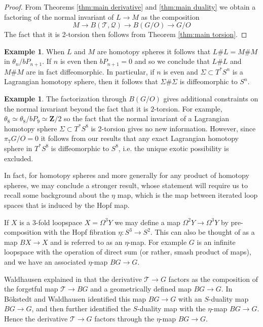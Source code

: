 \documentclass[reqno]{amsart}
\theoremstyle{theorem}
\theoremstyle{remark}
\theoremstyle{definition}
\newtheorem{example}[corollary]{Example}
\newcommand{\T}{\mathcal{T}}
\newcommand{\bZ}{\mathbf{Z}}
\newcommand{\QQ}{\mathcal{Q}}
\begin{document}
\begin{proof} From Theorems \ref{thm:main derivative} and \ref{thm:main duality} we obtain a factoring of the normal invariant of $L \to M$ as the composition 
$$ M \to B(\T,\QQ) \to B(G/O) \to G/O $$ 
The fact that it is 2-torsion then follows from Theorem \ref{thm:main torsion}.
\end{proof}


\begin{example} When $L$ and $M$ are homotopy spheres it follows that $L \# L =  M \# M$ in $\theta_n/bP_{n+1}$. If $n$ is even then $bP_{n+1}=0$ and so we conclude that $L \# L$ and $M \# M$ are in fact diffeomorphic. In particular, if $n$ is even and $\Sigma \subset T^*S^n$ is a Lagrangian homotopy sphere, then it follows that $\Sigma \# \Sigma$ is diffeomorphic to $S^n$.
\end{example}

\begin{example} The factorization through $B(G/O)$ gives additional constraints on the normal invariant beyond the fact that it is $2$-torsion.  For example, $\theta_8 \simeq \theta_8 / {bP}_9 \simeq \bZ/2$ so the fact that the normal invariant of a Lagrangian homotopy sphere $\Sigma \subset T^*S^8$ is 2-torsion gives no new information. However, since  $\pi_7G/O=0$ it follows from our results that any exact Lagrangian homotopy sphere in $T^*S^8$ is diffeomorphic to $S^8$, i.e. the unique exotic possibility is excluded. \end{example}

In fact, for homotopy spheres and more generally for any product of homotopy spheres, we may conclude a stronger result, whose statement will require us to recall some background about the $\eta$ map, which is the map between iterated loop spaces that is induced by the Hopf map. 



If $X$ is a 3-fold loopspace $X=\Omega^3Y$ we may define a map $\Omega^2Y \to \Omega^3Y$ by pre-composition with the Hopf fibration $\eta:S^3 \to S^2$. This can also be thought of as a map $BX \to X$ and is referred to as an $\eta$-map. For example $G$ is an infinite loopspace with the operation of direct sum (or rather, smash product of maps), and we have an associated $\eta$-map $BG \to G$. 


Waldhausen explained in \cite{W82} that the derivative $\T \to G$ factors as the composition of the forgetful map $\T \to BG$ and a geometrically defined map $BG \to G$. In \cite{BW88} B\"okstedt and Waldhausen identified this map $BG \to G$ with an $S$-duality map $BG \to G$, and then further identified the $S$-duality map with the $\eta$-map $BG \to G$. Hence the derivative $\T \to G$ factors through the $\eta$-map $BG \to G$. 
\end{document}
